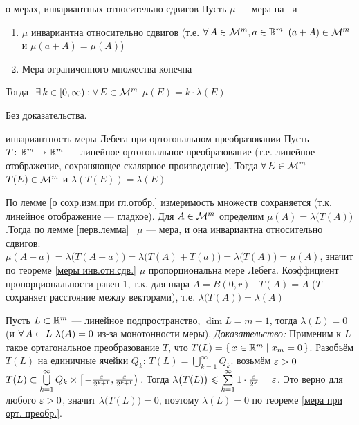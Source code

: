 \begin{teor}[https://www.youtube.com/live/Y10gq1j3ADI?si=PWNijQFbbR0Ia10-&t=8306]{о мерах, инвариантных относительно сдвигов}\label{меры инв.отн.сдв.}%
	Пусть $\mu$ --- мера  на \m\ и 
	\begin{enumerate}
		\item $\mu$ инвариантна относительно сдвигов (т.е. $\forall \, A \in \mathcal{M}^m, a \in \mathbb R^m$ $(a + A) \in \mathcal{M}^m$ и $\mu(a + A) = \mu(A)$)
		
		\item Мера ограниченного множества конечна
	\end{enumerate}
	\hspace{20pt}Тогда$\E k \in [0, \infty) : \A E \in \m$ $\mu(E) = k \cdot \lambda (E)$ 
\end{teor}

\begin{prf}
	Без доказательства.
\end{prf}

\begin{teor}[https://www.youtube.com/live/Y10gq1j3ADI?si=7KD9370OVRWXYlc7&t=8780]{инвариантность меры Лебега при ортогональном преобразовании}\label{мера при орт. преобр.}%
	Пусть $T \colon \mathbb R^m \to \mathbb R^m$ --- линейное ортогональное преобразование (т.е. линейное отображение, сохраняющее скалярное произведение). Тогда $\forall \, E \in \mathcal{M}^m$ $T(E) \in \mathcal{M}^m$ и $\lambda(T(E)) = \lambda(E)$
\end{teor}

\begin{prf}
	По лемме \ref{о сохр.изм.при гл.отобр.} измеримость множеств сохраняется (т.к. линейное отображение --- гладкое). Для $A \in \mathcal{M}^m$ определим $\mu(A) = \lambda\bigl(T(A)\bigr)$.Тогда по лемме \ref{перв.лемма} \ $\mu$ --- мера, и она инвариантна относительно сдвигов: $\mu(A + a) = \lambda\bigl(T(A + a)\bigr) = \lambda\bigl(T(A) + T(a)\bigr) = \lambda\bigl(T(A)\bigr) = \mu(A)$, значит по теореме \ref{меры инв.отн.сдв.} $\mu$ пропорциональна мере Лебега. Коэффициент пропорциональности равен 1, т.к. для шара $A = B(0, r)$ \ $T(A) = A$ ($T$ --- сохраняет расстояние между векторами), т.е. $\lambda\bigl(T(A)\bigr) = \lambda(A)$
\end{prf}

\begin{slv}[https://www.youtube.com/live/Y10gq1j3ADI?si=uhzBA3g_HLU0F6X-&t=9260]\label{мера подпр.}
	Пусть $L \subset \mathbb R^m$ --- линейное подпространство, $\dim L = m - 1$, тогда $\lambda(L) = 0$ (и $\forall \, A \subset L\ \lambda(A) = 0$ из-за монотонности меры). \textit{Доказательство:} Применим к $L$ такое ортагональное преобразование $T$, что $T(L) = \{\, x \in \mathbb R^m \mid x_m = 0\,\}$. Разобьём $T(L)$ на единичные ячейки $Q_k$: $T(L) = \bigcup\limits_{k = 1}^\infty Q_k$.  возьмём $\varepsilon > 0$ $T(L) \subset \bigcup\limits_{k = 1}^\infty Q_k \times \left[\left.-\frac{\varepsilon}{2^{k+1}}, \frac{\varepsilon}{2^{k+1}}\right)\right.$. Тогда $\lambda\bigl(T(L)\bigr) \leqslant \sum\limits_{k = 1}^\infty 1 \cdot \frac{\varepsilon}{2^k} = \varepsilon$. Это верно для любого $\varepsilon > 0$, значит $\lambda\bigl(T(L)\bigr) = 0$, поэтому $\lambda(L) = 0$ по теореме \ref{мера при орт. преобр.}.
\end{slv}

